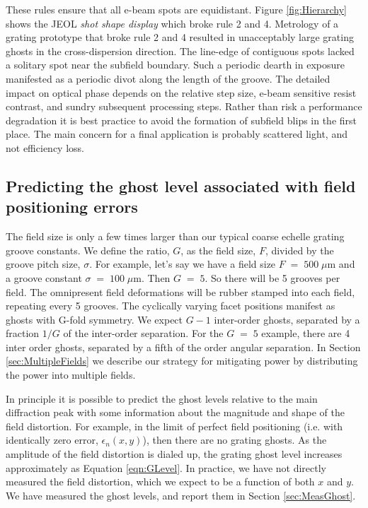\documentclass[]{spie}  %
\begin{document}
These rules ensure that all e-beam spots are equidistant.  Figure \ref{fig:Hierarchy}  shows the JEOL \emph{shot shape display} which broke rule 2 and 4.  Metrology of a grating prototype that broke rule 2 and 4 resulted in unacceptably large grating ghosts in the cross-dispersion direction.  The line-edge of contiguous spots lacked a solitary spot near the subfield boundary.  Such a periodic dearth in exposure manifested as a periodic divot along the length of the groove.  The detailed impact on optical phase depends on the relative step size, e-beam sensitive resist contrast, and sundry subsequent processing steps.  Rather than risk a performance degradation it is best practice to avoid the formation of subfield blips in the first place.  The main concern for a final application is probably scattered light, and not efficiency loss. 

\subsection{Predicting the ghost level associated with field positioning errors}
\label{sec:Ghosts}

The field size is only a few times larger than our typical coarse echelle grating groove constants.  We define the ratio, $G$, as the field size, $F$, divided by the groove pitch size, $\sigma$.  For example, let's say we have a field size $F\;=\;500\;\mu$m and a groove constant $\sigma \; =\; 100 \; \mu$m.  Then $G\;=\;5$.  So there will be 5 grooves per field.  The omnipresent field deformations will be rubber stamped into each field, repeating every 5 grooves.  The cyclically varying facet positions manifest as ghosts with G-fold symmetry. We expect $G-1$ inter-order ghosts, separated by a fraction $1/G$ of the inter-order separation.  For the $G\;=\;5$ example, there are 4 inter order ghosts, separated by a fifth of the order angular separation.  In Section \ref{sec:MultipleFields} we describe our strategy for mitigating power by distributing the power into multiple fields.

In principle it is possible to predict the ghost levels relative to the main diffraction peak with some information about the magnitude and shape of the field distortion.  For example, in the limit of perfect field positioning (i.e. with identically zero error, $\epsilon_n(x,y)$), then there are no grating ghosts.  As the amplitude of the field distortion is dialed up, the grating ghost level increases approximately as Equation \ref{eqn:GLevel}.  In practice, we have not directly measured the field distortion, which we expect to be a function of both $x $ and $y$.  We have measured the ghost levels, and report them in Section \ref{sec:MeasGhost}.
\end{document}
